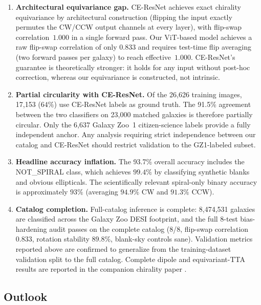 \begin{enumerate}
\item \textbf{Architectural equivariance gap.}  CE-ResNet achieves
  exact chirality equivariance by architectural construction (flipping
  the input exactly permutes the CW/CCW output channels at every
  layer), with flip-swap correlation~$1.000$ in a single forward pass.
  Our ViT-based model achieves a raw flip-swap correlation of only
  $0.833$ and requires test-time flip averaging (two forward passes per
  galaxy) to reach effective~$1.000$.  CE-ResNet's guarantee is
  theoretically stronger: it holds for any input without post-hoc
  correction, whereas our equivariance is constructed, not intrinsic.

\item \textbf{Partial circularity with CE-ResNet.}  Of the 26{,}626
  training images, 17{,}153 ($64\%$) use CE-ResNet labels as ground
  truth.  The 91.5\% agreement between the two classifiers on 23{,}000
  matched galaxies is therefore partially circular.  Only the 6{,}637
  Galaxy Zoo~1 citizen-science labels provide a fully independent
  anchor.  Any analysis requiring strict independence between our
  catalog and CE-ResNet should restrict validation to the GZ1-labeled
  subset.

\item \textbf{Headline accuracy inflation.}  The 93.7\% overall
  accuracy includes the NOT\_SPIRAL class, which achieves $99.4\%$ by
  classifying synthetic blanks and obvious ellipticals.  The
  scientifically relevant spiral-only binary accuracy is approximately
  $93\%$ (averaging $94.9\%$ CW and $91.3\%$ CCW).

\item \textbf{Catalog completion.}  Full-catalog inference is complete:
  8{,}474{,}531 galaxies are classified across the Galaxy Zoo DESI
  footprint, and the full 8-test bias-hardening audit passes on the
  complete catalog (8/8, flip-swap correlation $0.833$, rotation
  stability $89.8\%$, blank-sky controls sane).  Validation metrics
  reported above are confirmed to generalize from the training-dataset
  validation split to the full catalog.  Complete dipole and
  equivariant-TTA results are reported in the companion chirality paper
  \citep{Golden:2026chirality}.
\end{enumerate}

\subsection{Outlook}
\label{sec:chirality_outlook}

